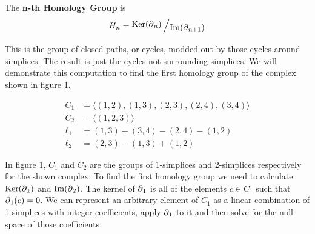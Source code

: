 \begin{definition}\label{def:nth-homology-group}
    The \textbf{n-th Homology Group} is \[H_n = \bigslant{\Ker(\boundary_n)}{\Ima(\boundary_{n+1})}\]
    \cite{fraleigha}
\end{definition}

This is the group of closed paths, or cycles, modded out by those cycles around simplices. The result is just the cycles not surrounding simplices. We will demonstrate this computation to find the first homology group of the complex shown in figure \ref{fig:example-cech}.

\begin{example}

    \begin{figure}
        \centering
        \begin{minipage}{.5\textwidth}
            \centering
            
        \end{minipage}%
        \begin{minipage}{.5\textwidth}
            \begin{align*}
                C_1 &= \langle (1,2),(1,3),(2,3),(2,4),(3,4) \rangle \\
                C_2 &= \langle (1,2,3) \rangle \\
                \ell_1 &= (1,3) + (3,4) - (2,4) - (1,2)\\
                \ell_2 &= (2,3) - (1,3) + (1,2)
            \end{align*}
        \end{minipage}
        \caption{}
        \label{fig:example-cech}
    \end{figure}

    In figure \ref{fig:example-cech}, \(C_1\) and \(C_2\) are the groups of 1-simplices and 2-simplices respectively for the shown complex.
    To find the first homology group we need to calculate \(\operatorname{Ker}(\operatorname{\partial}_1)\) and \(\operatorname{Im}(\operatorname{\partial}_2)\).
    The kernel of \(\operatorname{\partial}_1\) is all of the elements \(c \in C_1\) such that \(\operatorname{\partial}_1(c) = 0\). We can represent an arbitrary element of \(C_1\) as a linear combination of 1-simplices with integer coefficients, apply \(\operatorname{\partial}_1\) to it and then solve for the null space of those coefficients.


\end{example}
